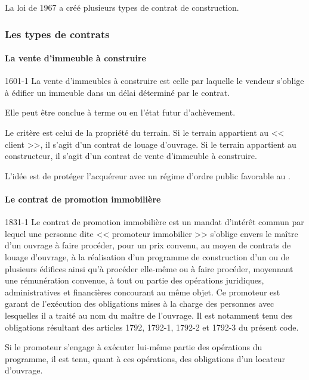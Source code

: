 			La loi de 1967 a créé plusieurs types de contrat de construction.
		
			\subsubsection{Les types de contrats}
			
				\paragraph{La vente d'immeuble à construire\\}
				
				\begin{citationArticleCciv}{1601-1}
					La vente d'immeubles à construire est celle par laquelle le vendeur s'oblige à édifier un immeuble dans un délai déterminé par le contrat.
					
					Elle peut être conclue à terme ou en l'état futur d'achèvement.
				\end{citationArticleCciv}
				
				Le critère est celui de la propriété du terrain. Si le terrain appartient au << client >>, il s'agit d'un contrat de louage d'ouvrage. Si le terrain appartient au constructeur, il s'agit d'un contrat de vente d'immeuble à construire.
				
				L'idée est de protéger l'acquéreur avec un régime d'ordre public favorable au \Mo.
				
				\paragraph{Le contrat de promotion immobilière\\}
				
				\begin{citationArticleCciv}{1831-1}
					Le contrat de promotion immobilière est un mandat d'intérêt commun par lequel une personne dite << promoteur immobilier >> s'oblige envers le maître d'un ouvrage à faire procéder, pour un prix convenu, au moyen de contrats de louage d'ouvrage, à la réalisation d'un programme de construction d'un ou de plusieurs édifices ainsi qu'à procéder elle-même ou à faire procéder, moyennant une rémunération convenue, à tout ou partie des opérations juridiques, administratives et financières concourant au même objet. Ce promoteur est garant de l'exécution des obligations mises à la charge des personnes avec lesquelles il a traité au nom du maître de l'ouvrage. Il est notamment tenu des obligations résultant des articles 1792, 1792-1, 1792-2 et 1792-3 du présent code.
					
					Si le promoteur s'engage à exécuter lui-même partie des opérations du programme, il est tenu, quant à ces opérations, des obligations d'un locateur d'ouvrage.
				\end{citationArticleCciv}
			
